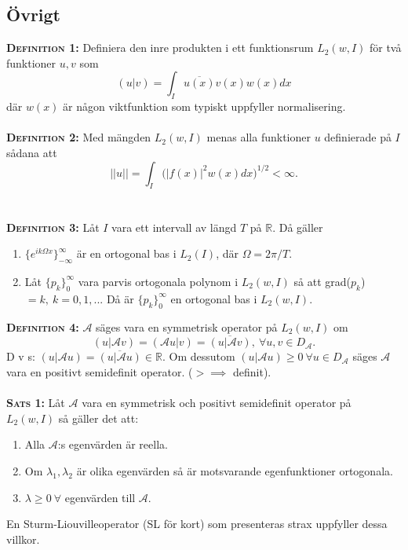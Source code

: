 \documentclass{article}
\begin{document}
\subsection{Övrigt}
\textbf{\textsc{Definition 1:}} Definiera den inre produkten i ett funktionsrum $L_2(w,I)$ för två funktioner $u,v$ som
\begin{equation}
    (u|v)=\int_{I}\overline{u(x)}v(x)w(x)dx
\end{equation}
där $w(x)$ är någon viktfunktion som typiskt uppfyller normalisering.\\ \\
\textbf{\textsc{Definition 2:}} Med mängden $L_2(w,I)$ menas alla funktioner $u$ definierade på $I$ sådana att 
\begin{equation}
    ||u||=\int_{I}\Big(|f(x)|^2w(x)dx\Big)^{1/2}<\infty.
\end{equation}\\ \\
\textbf{\textsc{Definition 3:}} Låt $I$ vara ett intervall av längd $T$ på $\mathbb{R}$. Då gäller
\begin{enumerate}[label=(\roman*)]
\item $\{e^{ik\Omega x}\}_{-\infty}^{\infty}$ är en ortogonal bas i $L_2(I)$, där $\Omega= 2\pi/T$.\\
\item Låt $\{p_k\}_0^{\infty}$ vara parvis ortogonala polynom i $L_2(w,I)$ så att grad($p_k$)$=k, \ k=0,1,...$ Då är $\{p_k\}_0^{\infty}$ en ortogonal bas i $L_2(w,I)$.
\end{enumerate}
\vspace{0.5 cm}
\textbf{\textsc{Definition 4:}} $\mathcal{A}$ säges vara en symmetrisk operator på $L_2(w,I)$ om
\begin{equation}
    (u|\mathcal{A}v)=(\mathcal{A}u|v)=\overline{(u|\mathcal{A}v)}, \  \forall u,v \in D_{\mathcal{A}}.
\end{equation}
D v s: $(u|\mathcal{A}u)=\overline{(u|\mathcal{A}u)}\in\mathbb{R}$. Om dessutom $(u|\mathcal{A}u)\geq 0 \ \forall u\in D_{\mathcal{A}}$ säges $\mathcal{A}$ vara en positivt semidefinit operator. ($> \implies$ definit).\\ \\
\textbf{\textsc{Sats 1:}} Låt $\mathcal{A}$ vara en symmetrisk och positivt semidefinit operator på $L_2(w,I)$ så gäller det att: 
\begin{enumerate}[label=(\roman*)]
\item Alla $\mathcal{A}$:s egenvärden är reella.\\
\item Om $\lambda_1,\lambda_2$ är olika egenvärden så är motsvarande egenfunktioner ortogonala.\\
\item $\lambda \geq 0 \ \forall$ egenvärden till $\mathcal{A}$. 
\end{enumerate}
En Sturm-Liouvilleoperator (SL för kort) som presenteras strax uppfyller dessa villkor.
\newpage
\end{document}
